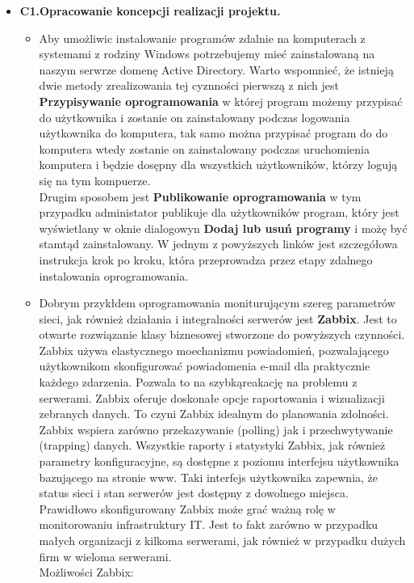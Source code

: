\documentclass[12pt]{article}
\renewcommand{\_}{\kern-1.5pt\textunderscore\kern-1.5pt}
\begin{document}
\begin{itemize}
	\item \textbf{C1.Opracowanie koncepcji realizacji projektu.}\par

\begin{itemize}
	\item Aby umożliwic instalowanie programów zdalnie na komputerach z systemami z rodziny Windows potrzebujemy mieć zainstalowaną na naszym serwrze domenę Active Directory. Warto wspomnieć, że istnieją dwie metody zrealizowania tej cyznności pierwszą z nich jest \textbf{Przypisywanie oprogramowania} w której program możemy przypisać do użytkownika i zostanie on zainstalowany podczas logowania użytkownika do komputera, tak samo można przypisać program do do komputera wtedy zostanie on zainstalowany podczas uruchomienia komputera i będzie dosępny dla wszystkich użytkowników, którzy logują się na tym kompuerze.\\
Drugim sposobem jest \textbf{Publikowanie oprogramowania} w tym przypadku administator publikuje dla użytkowników program, który jest wyświetlany w oknie dialogowyn \textbf{Dodaj lub usuń programy} i możę być stamtąd zainstalowany. W jednym z powyższych linków jest szczegółowa instrukcja krok po kroku, która przeprowadza przez etapy zdalnego instalowania oprogramowania.\par

	\item Dobrym przykłdem oprogramowania moniturującym szereg parametrów sieci, jak również działania i integralności serwerów jest \textbf{Zabbix}. Jest to otwarte rozwiązanie klasy biznesowej stworzone do powyższych czynności. Zabbix używa elastycznego moechanizmu powiadomień, pozwalającego użytkownikom skonfigurować powiadomenia e-mail dla praktycznie każdego zdarzenia. Pozwala to na szybkąreakację na problemu z serwerami. Zabbix oferuje doskonałe opcje raportowania i wizualizacji zebranych danych. To czyni Zabbix idealnym do planowania zdolności. Zabbix wspiera zarówno przekazywanie (polling) jak i przechwytywanie (trapping) danych. Wszystkie raporty i statystyki Zabbix, jak również parametry konfiguracyjne, są dostępne z poziomu interfejsu użytkownika bazującego na stronie www. Taki interfejs użytkownika zapewnia, że status sieci i stan serwerów jest dostępny z dowolnego miejsca. Prawidłowo skonfigurowany Zabbix może grać ważną rolę w monitorowaniu infrastruktury IT. Jest to fakt zarówno w przypadku małych organizacji z kilkoma serwerami, jak również w przypadku dużych firm w wieloma serwerami. \\
Możliwości Zabbix:\par


\end{itemize}
\end{itemize}
\end{document}
